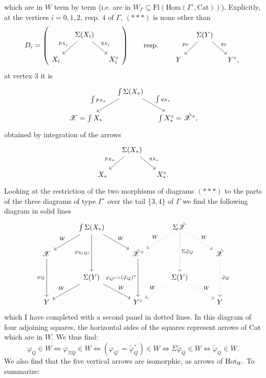 \documentclass[11pt]{article}
\newcommand{\printedpage}[1]{\marginpar{\footnotesize p.~#1}}
\newcommand{\msp}[1]{\marginpar{\footnotesize [#1]}}
\newcommand{\Cat}{\mathrm{Cat}}
\newcommand{\Hom}{\mathrm{Hom}}
\newcommand{\Hot}{\mathrm{Hot}}
\newcommand{\Fl}{\mathrm{Fl}}
\newcommand{\sX}{\mathscr{X}}
\newcommand{\tsX}{\tilde{\mathscr{X}}}
\begin{document}
which are in $W$ term by term (i.e. are in $W_\Gamma\subseteq\Fl(\underline{\Hom}(\Gamma^\circ,\Cat))$). Explicitly, at the vertices $i=0,1,2$, resp. $4$ of $\Gamma$, $(***)$ is none other than
\[
D_i =
\left(
\begin{tikzcd}[column sep=small]
 & \Sigma(X_i) \arrow[dl, "p_{X_i}"'] \arrow[dr, "q_{X_i}"] & \\
X_i & & X_i^\circ
\end{tikzcd}
\right)
\qquad \text{resp.} \qquad
\begin{tikzcd}[column sep=small]
 & \Sigma(Y) \arrow[dl, "p_Y"'] \arrow[dr, "q_Y"] & \\
Y & & Y^\circ,
\end{tikzcd}
\]
at vertex 3 it is
\[
\begin{tikzcd}[column sep=small]
 & \int\Sigma(X_*) \arrow[dl, "\int p_{X_*}"'] \arrow[dr, "\int q_{X_*}"] & \\
\sX=\int X_* & & \int X_*^\circ=\tsX^\circ,
\end{tikzcd}
\]
obtained by integration of the arrows
\[
\begin{tikzcd}[column sep=small]
 & \Sigma(X_*) \arrow[dl, "p_{X_*}"'] \arrow[dr, "q_{X_*}"] & \\
X_* & & X_*^\circ.
\end{tikzcd}
\]
\msp{page 140}
Looking at the restriction of the two morphisms of diagrams $(***)$ to the parts of the three diagrams of type $\Gamma^\circ$ over the tail $\{3,4\}$ of $\Gamma$ we find the following diagram in solid lines
\[
\begin{tikzcd}[column sep=3em, row sep=normal]
 & \int\Sigma(X_*) \arrow[dl, "W"'] \arrow[dr, "W"] \arrow[dd, "\varphi_{\Sigma(Q)}"'] & & \Sigma\tsX \arrow[dl, dotted, "W"'] \arrow[dr, dotted, "W"] \arrow[dd, dotted, "\Sigma\tilde{\varphi}_Q"] & \\
\sX \arrow[dd, "\varphi_Q"'] & & \tsX^\circ \arrow[dd, "\varphi_{Q^\circ}=(\tilde{\varphi}_Q)^\circ"'] & & \tsX \arrow[dd, dotted, "\tilde{\varphi}_Q"] \\
 & \Sigma(Y) \arrow[dl, "W"'] \arrow[dr, "W"] & & \Sigma(Y) \arrow[dl, dotted, "W"'] \arrow[dr, dotted, "W"] & \\
Y & & Y^\circ & & Y
\end{tikzcd}
\]
\printedpage{96}
which I have completed with a second panel in dotted lines. In this diagram of four adjoining squares, the horizontal sides of the squares represent arrows of $\Cat$ which are in $W$. We thus find: %
\[
\varphi_Q\in W \iff \varphi_{\Sigma Q}\in W \iff (\varphi_{Q^\circ}=\tilde{\varphi}_Q^\circ)\in W \iff \Sigma\tilde{\varphi}_Q\in W \iff \tilde{\varphi}_Q\in W.
\]
We also find that the five vertical arrows are isomorphic, as arrows of $\Hot_W$. To summarize:
\end{document}
